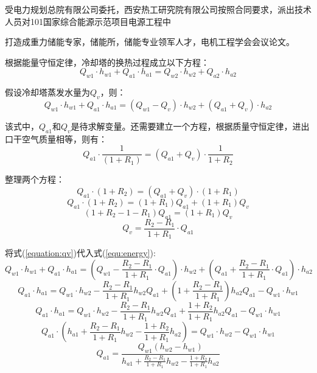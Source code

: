 

受电力规划总院有限公司委托，西安热工研究院有限公司按照合同要求，派出技术人员对101国家综合能源示范项目电源工程中

打造成重力储能专家，储能所，储能专业领军人才，电机工程学会会议论文。

根据能量守恒定律，冷却塔的换热过程成立以下方程：
$$ Q_{w1}\cdot h_{w1}+Q_{a1}\cdot h_{a1}=Q_{w2}\cdot h_{w2}+Q_{a2}\cdot h_{a2}$$

假设冷却塔蒸发水量为$Q_v$，则：
\begin{equation}
	Q_{w1}\cdot h_{w1}+Q_{a1}\cdot h_{a1}=(Q_{w1}-Q_v)\cdot h_{w2}+(Q_{a1}+Q_v)\cdot h_{a2}\label{equ:energy}
\end{equation}

该式中，$Q_{a1}$和$Q_v$是待求解变量。还需要建立一个方程，根据质量守恒定律，进出口干空气质量相等，则有：
\begin{equation}
	Q_{a1}\cdot \frac{1}{(1+R_1)}=(Q_{a1}+Q_v) \cdot \frac{1}{1+R_2}
\end{equation}

整理两个方程：
$$	Q_{a1}\cdot (1+R_2) = (Q_{a1}+Q_v)\cdot (1+R_1)$$
$$	Q_{a1}\cdot (1+R_2)=(1+R_1)Q_{a1}+(1+R_1)Q_v$$
$$ (1+R_2-1-R_1)Q_{a1}=(1+R_1)Q_v $$
\begin{equation}
Q_v=\frac{R_2-R_1}{1+R_1}\cdot Q_{a1} \label{equation:qv}
\end{equation}

将式(\ref{equation:qv})代入式(\ref{equ:energy}):
$$ Q_{w1}\cdot h_{w1}+Q_{a1}\cdot h_{a1}=(Q_{w1}-\frac{R_2-R_1}{1+R_1}\cdot Q_{a1})\cdot h_{w2}+(Q_{a1}+\frac{R_2-R_1}{1+R_1}\cdot Q_{a1})\cdot h_{a2} $$
$$ Q_{a1}\cdot h_{a1}=Q_{w1}\cdot h_{w2}-\frac{R_2-R_1}{1+R_1} h_{w2} Q_{a1}+(1+\frac{R_2-R_1}{1+R_1}) h_{a2}Q_{a1} -Q_{w1}\cdot h_{w1} $$
$$ Q_{a1}\cdot h_{a1}=Q_{w1}\cdot h_{w2}-\frac{R_2-R_1}{1+R_1} h_{w2} Q_{a1}+\frac{1+R_2}{1+R_1} h_{a2}Q_{a1} -Q_{w1}\cdot h_{w1} $$
$$ Q_{a1}\cdot (h_{a1}+\frac{R_2-R_1}{1+R_1} h_{w2}-\frac{1+R_2}{1+R_1} h_{a2})=Q_{w1}\cdot h_{w2} -Q_{w1}\cdot h_{w1} $$
$$ Q_{a1}= \frac{Q_{w1}(h_{w2} -h_{w1})}{h_{a1}+\frac{R_2-R_1}{1+R_1} h_{w2}-\frac{1+R_2}{1+R_1} h_{a2}} $$


